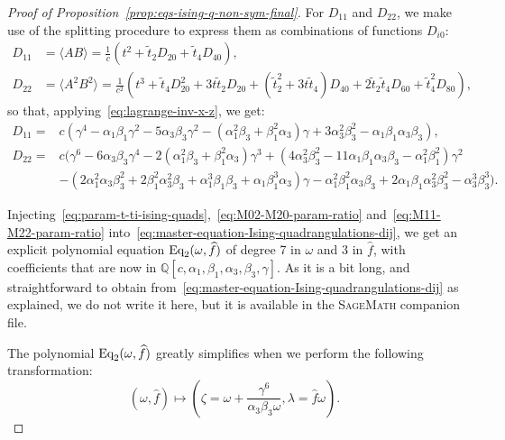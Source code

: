 \documentclass{scrartcl}
\newcommand\brak[1]{\big \langle #1 \big\rangle}
\newcommand{\Q}{\mathbb{Q}}
\newcommand\wt[1]{\widetilde{#1}}
\newcommand\wh[1]{\widehat{#1}}
\begin{document}
\begin{proof}[Proof of Proposition~\ref{prop:eqs-ising-q-non-sym-final}]
For $D_{11}$ and $D_{22}$, we make use of the splitting procedure to express them as combinations of functions $D_{i0}$:
\begin{equation*}
\begin{aligned}
D_{11}&=\brak{AB}=\frac{1}{c}\left(t^2+\wt{t}_2D_{20}+\wt{t}_4D_{40}\right),\\
D_{22}&=\brak{A^2B^2}=\frac{1}{c^2}\left(t^3+\wt t_4D_{20}^2+3t\wt t_2D_{20}+(\wt t_2^2+3t\wt t_4)D_{40}+2\wt t_2\wt t_4D_{60}+\wt t_4^2D_{80}\right),
\end{aligned}
\end{equation*}
so that, applying~\eqref{eq:lagrange-inv-x-z}, we get:
\begin{equation}
\begin{aligned}
D_{11}=&c\left(\gamma^4-\alpha_1\beta_1\gamma^2-5\alpha_3\beta_3\gamma^2-(\alpha_1^2\beta_3+\beta_1^2\alpha_3)\gamma+3\alpha_3^2\beta_3^2-\alpha_1\beta_1\alpha_3\beta_3\right),\\
D_{22}=&c\big(\gamma^6-6\alpha_3\beta_3\gamma^4-2(\alpha_1^2\beta_3+\beta_1^2\alpha_3)\gamma^3+(4\alpha_3^2\beta_3^2-11\alpha_1\beta_1\alpha_3\beta_3-\alpha_1^2\beta_1^2)\gamma^2\\
     &-(2\alpha_1^2\alpha_3\beta_3^2+2\beta_1^2\alpha_3^2\beta_3+\alpha_1^3\beta_1\beta_3+\alpha_1\beta_1^3\alpha_3)\gamma-\alpha_1^2\beta_1^2\alpha_3\beta_3+2\alpha_1\beta_1\alpha_3^2\beta_3^2-\alpha_3^3\beta_3^3\big).
\end{aligned}
\label{eq:M11-M22-param-ratio}
\end{equation}

Injecting~\eqref{eq:param-t-ti-ising-quads},~\eqref{eq:M02-M20-param-ratio} and~\eqref{eq:M11-M22-param-ratio} into~\eqref{eq:master-equation-Ising-quadrangulations-dij}, we get an explicit polynomial equation $\textnormal{Eq}_2(\omega,\wh{f})$ of degree 7 in $\omega$ and 3 in $\wh{f}$, with coefficients that are now in $\Q[c,\alpha_1,\beta_1,\alpha_3,\beta_3,\gamma]$. As it is a bit long, and straightforward to obtain from~\eqref{eq:master-equation-Ising-quadrangulations-dij} as explained, we do not write it here, but it is available in the \textsc{SageMath} companion file. 

The polynomial $\textnormal{Eq}_2(\omega,\wh{f})$ greatly simplifies when we perform the following transformation:
\begin{equation}
\left(\omega,\wh{f}\right) \mapsto \left(\zeta=\omega+\frac{\gamma^6}{\alpha_3\beta_3\omega}, \lambda=\wh{f}\omega\right).
\end{equation}


\end{proof}
\end{document}
